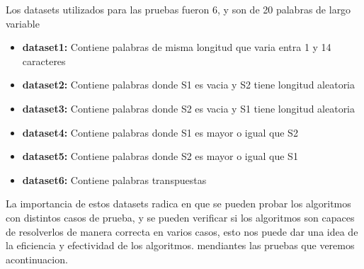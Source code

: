 Los datasets utilizados para las pruebas fueron 6, y son de 20 palabras de largo variable
\begin{itemize}
    \item \textbf{dataset1:} Contiene palabras de misma longitud que varia entra 1 y 14 caracteres
    \item \textbf{dataset2:} Contiene palabras donde S1 es vacia y S2 tiene longitud aleatoria
    \item \textbf{dataset3:} Contiene palabras donde S2 es vacia y S1 tiene longitud aleatoria
    \item \textbf{dataset4:} Contiene palabras donde S1 es mayor o igual que S2
    \item \textbf{dataset5:} Contiene palabras donde S2 es mayor o igual que S1
    \item \textbf{dataset6:} Contiene palabras transpuestas
\end{itemize}

La importancia de estos datasets radica en que se pueden probar los algoritmos con distintos casos de prueba, y se pueden
verificar si los algoritmos son capaces de resolverlos de manera correcta en varios casos, esto nos puede dar una idea de
la eficiencia y efectividad de los algoritmos. mendiantes las pruebas que veremos acontinuacion.